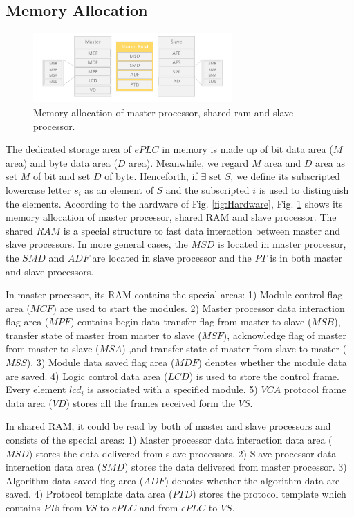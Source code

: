 \documentclass[journal,UTF8]{IEEEtran}
\begin{document}
\subsection{Memory Allocation}
\begin{figure}
	\centering
	\includegraphics[width=3in]{fig/RAM.pdf}
	\caption{Memory allocation of master processor, shared ram and slave processor.}
	\label{fig:RAM}
\end{figure}
 The dedicated storage area of $ePLC$ in memory is made up of bit data area ($M$ area) and byte data area ($D$ area). Meanwhile, we regard $M$ area and $D$ area as set $M$ of bit and set $D$ of byte. Henceforth, if $\exists$ set $S$, we define its subscripted lowercase letter $s_i$ as an element of $S$ and the subscripted $i$ is used to distinguish the elements. According to the hardware of Fig. \ref{fig:Hardware}, Fig. \ref{fig:RAM} shows its memory allocation of master processor, shared RAM and slave processor. The shared $RAM$ is a special structure to fast data interaction between master and slave processors. In more general cases, the $MSD$ is located in master processor, the $SMD$ and $ADF$ are located in slave processor and the $PT$ is in both master and slave processors. 

In master processor, its RAM contains the special areas: 1) Module control flag area ($MCF$) are used to start the modules. 2) Master processor data interaction flag area ($MPF$) contains begin data transfer flag from master to slave ($MSB$), transfer state of master from master to slave ($MSF$), acknowledge flag of master from master to slave ($MSA$) ,and transfer state of master from slave to master ($MSS$). 3) Module data saved flag area ($MDF$) denotes whether the module data are saved. 4) Logic control data area ($LCD$) is used to store the control frame. Every element $lcd_i$ is associated with a specified module. 5) $VCA$ protocol frame data area ($VD$) stores all the frames received form the $VS$.  

In shared RAM, it could be read by both of master and slave processors and consists of the special areas: 1) Master processor data interaction data area ($MSD$) stores the data delivered from slave processors. 2) Slave processor data interaction data area ($SMD$) stores the data delivered from master processor. 3) Algorithm data saved flag area ($ADF$) denotes whether the algorithm data are saved. 4) Protocol template data area ($PTD$) stores the protocol template which contains $PT$s from $VS$ to $ePLC$ and from $ePLC$ to $VS$.
\end{document}
